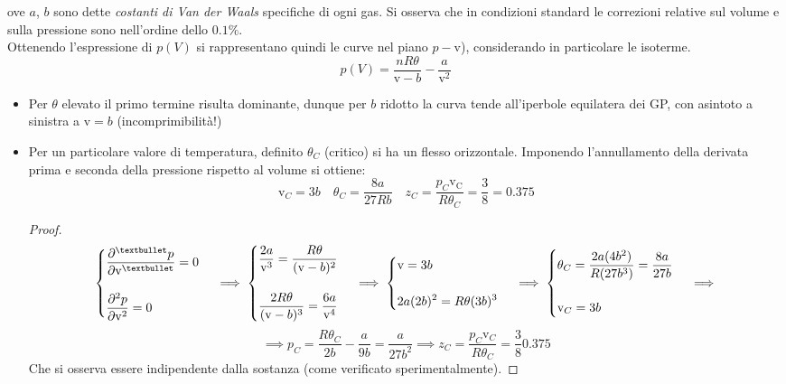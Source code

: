 \documentclass[10pt, oneside]{book}
\newcommand{\molvol}{\mathrm{v}}
\begin{document}
ove $a$, $b$ sono dette \textit{costanti di Van der Waals} specifiche di ogni gas. Si osserva che in condizioni standard le correzioni relative sul volume e sulla pressione sono nell'ordine dello $0.1\%$. 
\\Ottenendo l'espressione di $p(V)$ si rappresentano quindi le curve nel piano $p-\molvol$), considerando in particolare le isoterme. 
\[p(V) = \frac{nR\theta}{\molvol - b} - \frac{a}{\molvol^2}\]
\begin{itemize}[label=$\square$]
\item Per $\theta$ elevato il primo termine risulta dominante, dunque per $b$ ridotto la curva tende all'iperbole equilatera dei GP, con asintoto a sinistra a $\molvol = b$ (incomprimibilità!)
\item Per un particolare valore di temperatura, definito $\theta_C$ (critico) si ha un flesso orizzontale. Imponendo l'annullamento della derivata prima e seconda della pressione rispetto al volume si ottiene:
\[\mathrm{v}_C = 3 b \quad \theta_C = \frac{8 a}{27 R b} \quad z_C = \frac{p_C \mathrm{v_C}}{R \theta_C} = \frac{3}{8} = 0.375\]
\begin{proof}
\[\begin{cases} \displaystyle \pdv[•]{p}{\molvol} = 0 \\ \\\displaystyle \pdv[2]{p}{\molvol} = 0
\end{cases} \implies \begin{cases} \displaystyle \frac{2a}{\molvol^3} = \frac{R \theta}{(\molvol - b)^2}\\ \\\displaystyle \frac{2 R \theta}{(\molvol - b)^3} = \frac{6a}{\molvol^4}
\end{cases} \implies \begin{cases} \displaystyle \molvol = 3b \\ \\ \displaystyle 2a(2b)^2 = R \theta (3b)^3
\end{cases} \implies \begin{cases} \displaystyle \theta_C = \frac{2a (4b^2)}{R (27b^3)} = \frac{8a}{27b} \\ \\ \displaystyle \molvol_C = 3b
\end{cases} \implies\]
\[\implies p_C = \frac{R \theta_C}{2b} - \frac{a}{9b} = \frac{a}{27b^2} \implies z_C = \frac{p_C \molvol_C}{R \theta_C} = \frac{3}{8} 0.375\]
Che si osserva essere indipendente dalla sostanza (come verificato sperimentalmente).

\end{proof}
\end{itemize}
\end{document}
